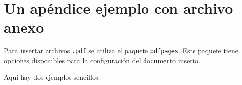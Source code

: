 \chapter{Un apéndice ejemplo con archivo anexo}

Para insertar archivos \texttt{.pdf} se utiliza el paquete \texttt{pdfpages}. Este paquete tiene opciones disponibles para la configuración del documento inserto.

Aquí hay dos ejemplos sencillos.

%



